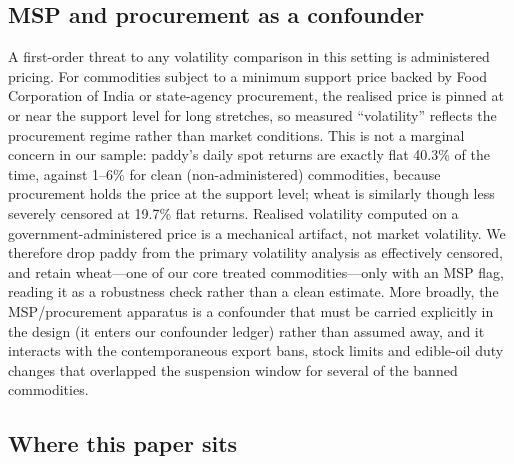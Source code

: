 \subsection{MSP and procurement as a confounder}
\label{sec:background-msp}

A first-order threat to any volatility comparison in this setting is administered
pricing. For commodities subject to a minimum support price backed by Food
Corporation of India or state-agency procurement, the realised price is pinned at or
near the support level for long stretches, so measured ``volatility'' reflects the
procurement regime rather than market conditions. This is not a marginal concern in
our sample: paddy's daily spot returns are exactly flat 40.3\% of the time, against
1--6\% for clean (non-administered) commodities, because procurement holds the price at
the support level; wheat is similarly though less severely censored at 19.7\% flat
returns. Realised volatility computed on a government-administered price is a
mechanical artifact, not market volatility. We therefore drop paddy from the primary
volatility analysis as effectively censored, and retain wheat---one of our core
treated commodities---only with an MSP flag, reading it as a robustness check rather
than a clean estimate. More broadly, the MSP/procurement apparatus is a confounder
that must be carried explicitly in the design (it enters our confounder ledger) rather
than assumed away, and it interacts with the contemporaneous export bans, stock limits
and edible-oil duty changes that overlapped the suspension window for several of the
banned commodities.

\subsection{Where this paper sits}
\label{sec:background-gap}

